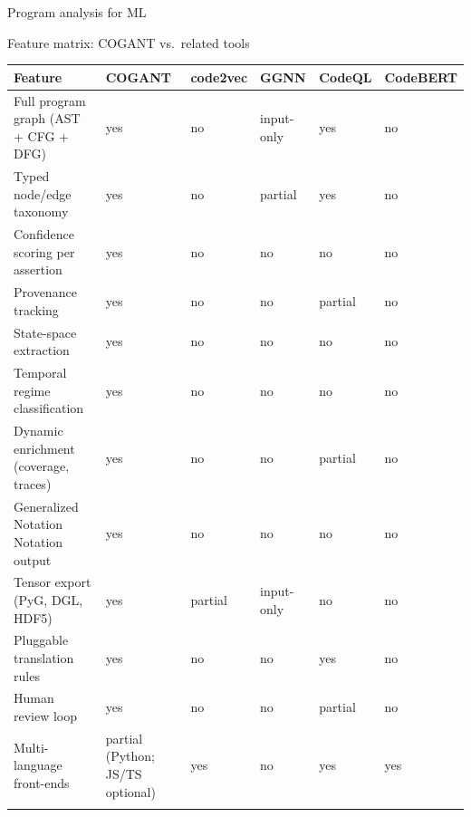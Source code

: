 \documentclass[
  ignorenonframetext,
]{beamer}
\newcounter{none} %
\begin{document}
\begin{frame}[fragile]{Program analysis for ML}
\begin{block}{Feature matrix: COGANT vs.~related tools}
{\def\LTcaptype{none} %
\begin{longtable}[]{@{}
  >{\raggedright\arraybackslash}p{}
  >{\centering\arraybackslash}p{}
  >{\centering\arraybackslash}p{}
  >{\centering\arraybackslash}p{}
  >{\centering\arraybackslash}p{}
  >{\centering\arraybackslash}p{}@{}}
\toprule\noalign{}
\begin{minipage}[b]{\linewidth}\raggedright
Feature
\end{minipage} & \begin{minipage}[b]{\linewidth}\centering
COGANT
\end{minipage} & \begin{minipage}[b]{\linewidth}\centering
code2vec
\end{minipage} & \begin{minipage}[b]{\linewidth}\centering
GGNN
\end{minipage} & \begin{minipage}[b]{\linewidth}\centering
CodeQL
\end{minipage} & \begin{minipage}[b]{\linewidth}\centering
CodeBERT
\end{minipage} \\
\midrule\noalign{}
\endhead
Full program graph (AST + CFG + DFG) & yes & no & input-only & yes &
no \\
Typed node/edge taxonomy & yes & no & partial & yes & no \\
Confidence scoring per assertion & yes & no & no & no & no \\
Provenance tracking & yes & no & no & partial & no \\
State-space extraction & yes & no & no & no & no \\
Temporal regime classification & yes & no & no & no & no \\
Dynamic enrichment (coverage, traces) & yes & no & no & partial & no \\
Generalized Notation Notation output & yes & no & no & no & no \\
Tensor export (PyG, DGL, HDF5) & yes & partial & input-only & no & no \\
Pluggable translation rules & yes & no & no & yes & no \\
Human review loop & yes & no & no & partial & no \\
Multi-language front-ends & partial (Python; JS/TS optional) & yes & no
& yes & yes \\
\bottomrule\noalign{}
\end{longtable}
}


\end{block}
\end{frame}
\end{document}
